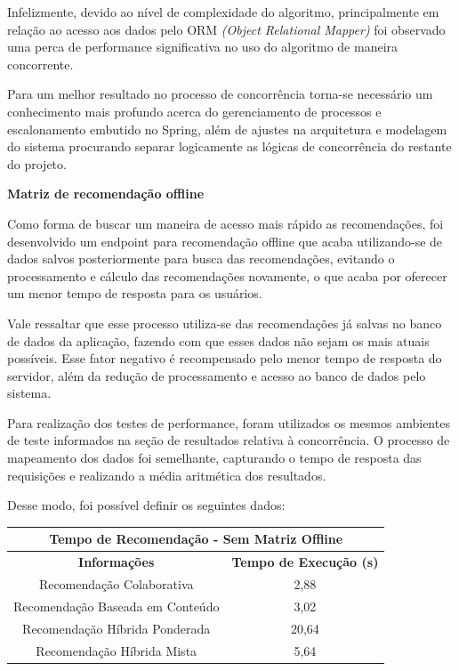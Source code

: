 Infelizmente, devido ao nível de complexidade do algoritmo, principalmente em relação ao acesso aos dados pelo ORM \textit{(Object Relational Mapper)} foi observado uma perca de performance significativa no uso do algoritmo de maneira concorrente.

Para um melhor resultado no processo de concorrência torna-se necessário um conhecimento mais profundo acerca do gerenciamento de processos e escalonamento embutido no Spring, além de ajustes na arquitetura e modelagem do sistema procurando separar logicamente as lógicas de concorrência do restante do projeto.

\textbf{Matriz de recomendação offline}

Como forma de buscar um maneira de acesso mais rápido as recomendações, foi desenvolvido um endpoint para recomendação offline que acaba utilizando-se de dados salvos posteriormente para busca das recomendações, evitando o processamento e cálculo das recomendações novamente, o que acaba por oferecer um menor tempo de resposta para os usuários.

Vale ressaltar que esse processo utiliza-se das recomendações já salvas no banco de dados da aplicação, fazendo com que esses dados não sejam os mais atuais possíveis. Esse fator negativo é recompensado pelo menor tempo de resposta do servidor, além da redução de processamento e acesso ao banco de dados pelo sistema.

Para realização dos testes de performance, foram utilizados os mesmos ambientes de teste informados na seção de resultados relativa à concorrência. O processo de mapeamento dos dados foi semelhante, capturando o tempo de resposta das requisições e realizando a média aritmética dos resultados.

Desse modo, foi possível definir os seguintes dados:

\begin{table}[H]
\centering
\begin{tabular}{|c|c|}
\hline
\multicolumn{2}{|c|}{\textbf{Tempo de Recomendação - Sem Matriz Offline}} \\ \hline
\textbf{Informações}                 & \textbf{Tempo de Execução (s)}    \\ \hline
Recomendação Colaborativa            & 2,88                               \\ \hline
Recomendação Baseada em Conteúdo     & 3,02                               \\ \hline
Recomendação Híbrida Ponderada       & 20,64                              \\ \hline
Recomendação Híbrida Mista           & 5,64                               \\ \hline
\end{tabular}
\end{table}

